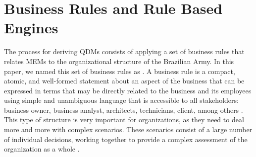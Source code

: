 




\section{Business Rules and Rule Based Engines}\label{sec:rbs}


The process for deriving QDMs consists of applying a set of business rules that 
relates MEMs to the organizational structure of the Brazilian Army. In this paper, we named 
this set of business rules as \callers. A business rule is a compact, atomic, and well-formed 
statement about an aspect of the business that can be expressed in terms that may be 
directly related to the business and its employees using simple and unambiguous language 
that is accessible to all stakeholders: business owner, business analyst, architects, technicians, client, 
among others \cite{graham2007}. This type of structure is very important for organizations, 
as they need to deal more and more with complex scenarios. These scenarios consist of a 
large number of individual decisions, working together to provide a 
complex assessment of the organization as a whole \cite{salatino2016}.

